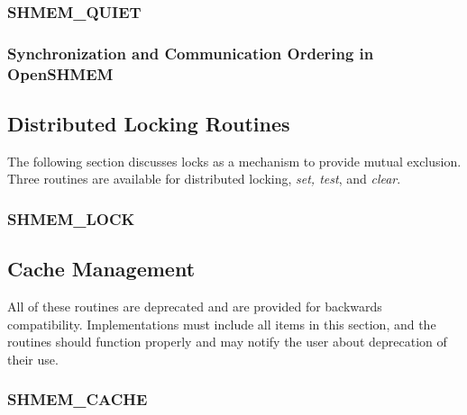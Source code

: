 \documentclass[10pt]{book}
\begin{document}
\subsubsection{\textbf{SHMEM\_QUIET}}\label{subsec:shmem_quiet}


\subsubsection{Synchronization and Communication Ordering in OpenSHMEM}







\subsection{Distributed Locking Routines}
The following section discusses \openshmem locks as a mechanism to provide
mutual exclusion. Three routines are available for distributed locking,
\textit{set, test}, and \textit{clear}.

\subsubsection{\textbf{SHMEM\_LOCK}}\label{subsec:shmem_lock}






\subsection{Cache Management}
All of these routines are deprecated and are provided for backwards
compatibility.  Implementations must include all items in this section, and the
routines should function properly and may notify the user about deprecation of
their use.

\subsubsection{\textbf{SHMEM\_CACHE}}\label{subsec:shmem_cache}






\clearpage




\end{document}
